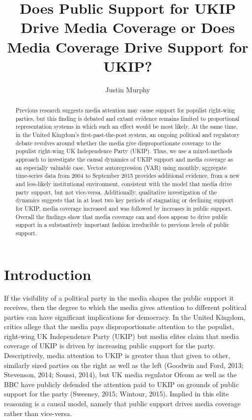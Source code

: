 \documentclass[12pt,article]{article}
\title{Does Public Support for UKIP Drive Media Coverage or Does Media Coverage
Drive Support for UKIP?}
\author{Justin Murphy}
\date{}
\begin{document}
\maketitle

\begin{abstract}
Previous research suggests media attention may cause support for populist right-wing parties, but this finding is debated and extant evidence remains limited to proportional representation systems in which such an effect would be most likely. At the same time, in the United Kingdom's first-past-the-post system, an ongoing political and regulatory debate revolves around whether the media give disproportionate coverage to the populist right-wing UK Independence Party (UKIP). Thus, we use a mixed-methods approach to investigate the causal dynamics of UKIP support and media coverage as an especially valuable case. Vector autoregression (VAR) using monthly, aggregate time-series data from 2004 to September 2015 provides additional evidence, from a new and less-likely institutional environment, consistent with the model that media drive party support, but not vice-versa. Additionally, qualitative investigation of
the dynamics suggests that in at least two key periods of stagnating or declining support for UKIP, media coverage increased and was followed by increases in public support. Overall the findings show that media coverage can and does
appear to drive public support in a substantively important fashion irreducible
to previous levels of public support.
\end{abstract}
\doublespacing

\section{Introduction}\label{introduction}

If the visibility of a political party in the media shapes the public
support it receives, then the degree to which the media gives attention
to different political parties can have significant implications for
democracy. In the United Kingdom, critics allege that the media pays
disproportionate attention to the populist, right-wing UK Independence
Party (UKIP) but media elites claim that media coverage of UKIP is
driven by increasing public support for the party. Descriptively, media
attention to UKIP is greater than that given to other, similarly sized
parties on the right as well as the left (Goodwin and Ford, 2013;
Stevenson, 2014; Soussi, 2014), but UK media regulator Ofcom as well as
the BBC have publicly defended the attention paid to UKIP on grounds of
public support for the party (Sweeney, 2015; Wintour, 2015). Implied in
this elite reasoning is a causal model, namely that public support
drives media coverage rather than vice-versa.
\end{document}

